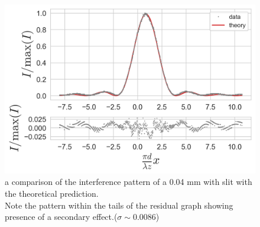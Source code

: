 \begin{figure}[H]
    \includegraphics[width=0.9\columnwidth]{figures/single slit interference with 0.04mm width.png}
    \caption{a comparison of the interference pattern of a 0.04 mm with slit with the theoretical prediction.\\
    Note the pattern within the tails of the residual graph showing presence of a secondary effect.($\sigma\sim0.0086$)}
    \label{fig:single slit interference with 0.04mm width}
\end{figure}